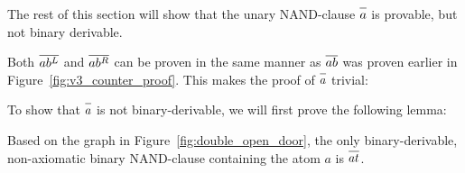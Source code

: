 The rest of this section will show that the unary NAND-clause $\ol{a}$ is provable, but not binary derivable.

Both $\ol{ab^L}$ and $\ol{ab^R}$ can be proven in the same manner as $\ol{ab}$ was proven earlier in Figure~\ref{fig:v3_counter_proof}.
This makes the proof of $\ol{a}$ trivial:\par
\begin{figure}[!h]
  \centering
  \begin{prooftree*}
    \Hypo{\dots}
    \Hypo{\dots}
  \end{prooftree*}
  \caption{}
  \label{fig:unary_nand_proof}
\end{figure}
To show that $\ol{a}$ is not binary-derivable, we will first prove the following lemma:
\begin{lemma}
  Based on the graph in Figure~\ref{fig:double_open_door}, the only binary-derivable, non-axiomatic binary NAND-clause containing the atom $a$ is $\ol{at}$.
\end{lemma}


